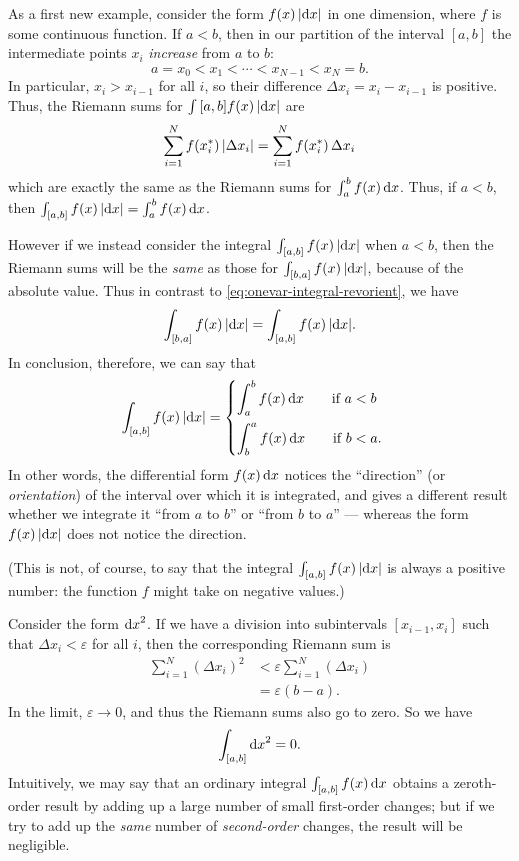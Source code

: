 \begin{eg}\label{eg:onevar-absint}
  As a first new example, consider the form $f(x) \, |\dx|$ in one dimension, where $f$ is some continuous function.
  If $a<b$, then in our partition of the interval $[a,b]$ the intermediate points $x_i$ \emph{increase} from $a$ to $b$:
  \[ a = x_0 < x_1 < \cdots < x_{N-1} < x_N = b. \]
  In particular, $x_i > x_{i-1}$ for all $i$, so their difference $\Delta x_i = x_i - x_{i-1}$ is positive.
  Thus, the Riemann sums for $\int{[a,b]} f(x) \, |\dx|$ are
  \[ \sum_{i=1}^N f(\rstag x i)\, |\Delta x_i| = \sum_{i=1}^N f(\rstag x i)\, \Delta x_i\]
  which are exactly the same as the Riemann sums for $\itint x a b {f(x)}$.
  Thus, if $a<b$, then $\lint{[a,b]} f(x) \, |\dx| = \itint x a b {f(x)}$.

  However if we instead consider the integral $\lint{[a,b]} f(x) \, |\dx|$ when $a<b$, then the Riemann sums will be the \emph{same} as those for $\lint{[b,a]} f(x) \, |\dx|$, because of the absolute value.
  Thus in contrast to \cref{eq:onevar-integral-revorient}, we have
  \begin{equation}\label{eq:onevar-absint-revorient}
    \lint{[b,a]} f(x)\,|\dx| = \lint{[a,b]} f(x) \,|\dx|.
  \end{equation}
  In conclusion, therefore, we can say that
  \begin{equation}
    \lint{[a,b]} f(x) \,|\dx| =
    \begin{cases}
      \displaystyle\itint x a b {f(x)} \qquad\text{if } a<b\\[10pt]
      \displaystyle\itint x b a {f(x)} \qquad\text{if } b<a.
    \end{cases}\label{eq:onevar-absint}
  \end{equation}
  In other words, the differential form $f(x)\,\dx$ notices the ``direction'' (or \emph{orientation}) of the interval over which it is integrated, and gives a different result whether we integrate it ``from $a$ to $b$'' or ``from $b$ to $a$'' --- whereas the form $f(x)\,|\dx|$ does not notice the direction.

  (This is not, of course, to say that the integral $\lint{[a,b]} f(x) \,|\dx|$ is always a positive number: the function $f$ might take on negative values.)
\end{eg}

\begin{eg}
  Consider the form $\dx^2$.
  If we have a division into subintervals $[x_{i-1},x_i]$ such that $\Delta x_i < \varepsilon$ for all $i$, then the corresponding Riemann sum is
  \begin{align*}
    \sum_{i=1}^N (\Delta x_i)^2 &< \varepsilon \sum_{i=1}^N (\Delta x_i)\\
    &= \varepsilon (b-a).
  \end{align*}
  In the limit, $\varepsilon \to 0$, and thus the Riemann sums also go to zero.
  So we have
  \[ \lint{[a,b]} \dx^2 = 0. \]
  Intuitively, we may say that an ordinary integral $\lint{[a,b]} f(x) \,\dx$ obtains a zeroth-order result by adding up a large number of small first-order changes; but if we try to add up the \emph{same} number of \emph{second-order} changes, the result will be negligible.
\end{eg}

